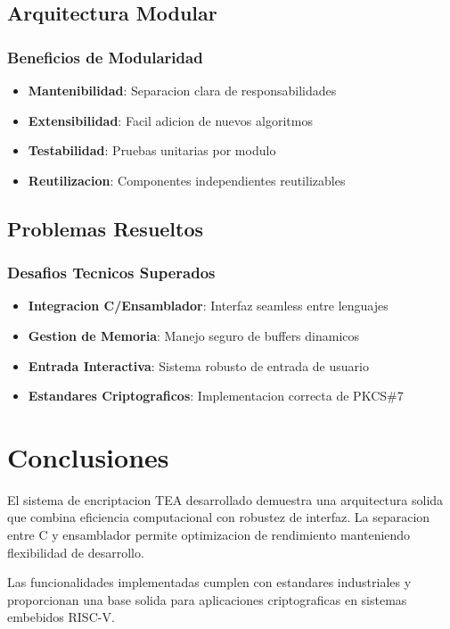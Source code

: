 \documentclass[12pt,a4paper]{article}
\begin{document}
\subsection{Arquitectura Modular}

\subsubsection{Beneficios de Modularidad}
\begin{itemize}
\item \textbf{Mantenibilidad}: Separacion clara de responsabilidades
\item \textbf{Extensibilidad}: Facil adicion de nuevos algoritmos
\item \textbf{Testabilidad}: Pruebas unitarias por modulo
\item \textbf{Reutilizacion}: Componentes independientes reutilizables
\end{itemize}

\subsection{Problemas Resueltos}

\subsubsection{Desafios Tecnicos Superados}
\begin{itemize}
\item \textbf{Integracion C/Ensamblador}: Interfaz seamless entre lenguajes
\item \textbf{Gestion de Memoria}: Manejo seguro de buffers dinamicos
\item \textbf{Entrada Interactiva}: Sistema robusto de entrada de usuario
\item \textbf{Estandares Criptograficos}: Implementacion correcta de PKCS\#7
\end{itemize}

\section{Conclusiones}

El sistema de encriptacion TEA desarrollado demuestra una arquitectura solida que combina eficiencia computacional con robustez de interfaz. La separacion entre C y ensamblador permite optimizacion de rendimiento manteniendo flexibilidad de desarrollo.

Las funcionalidades implementadas cumplen con estandares industriales y proporcionan una base solida para aplicaciones criptograficas en sistemas embebidos RISC-V.
\end{document}
